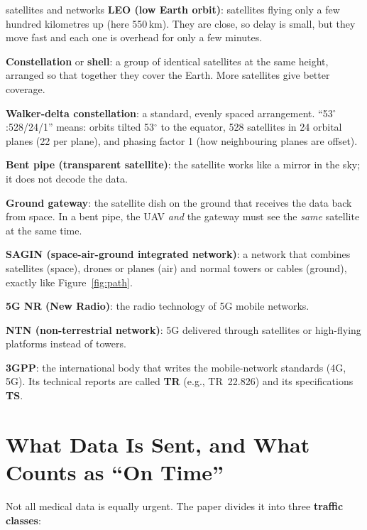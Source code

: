 \documentclass[11pt,a4paper]{article}
\newcommand{\kt}[1]{\textbf{\color{navy}#1}}
\begin{document}
\begin{term}{satellites and networks}
\kt{LEO (low Earth orbit)}: satellites flying only a few hundred kilometres up (here 550\,km). They are close, so delay is small, but they move fast and each one is overhead for only a few minutes.\par
\kt{Constellation} or \kt{shell}: a group of identical satellites at the same height, arranged so that together they cover the Earth. More satellites give better coverage.\par
\kt{Walker-delta constellation}: a standard, evenly spaced arrangement. ``53$^\circ$:528/24/1'' means: orbits tilted 53$^\circ$ to the equator, 528 satellites in 24 orbital planes (22 per plane), and phasing factor 1 (how neighbouring planes are offset).\par
\kt{Bent pipe (transparent satellite)}: the satellite works like a mirror in the sky; it does not decode the data.\par
\kt{Ground gateway}: the satellite dish on the ground that receives the data back from space. In a bent pipe, the UAV \emph{and} the gateway must see the \emph{same} satellite at the same time.\par
\kt{SAGIN (space-air-ground integrated network)}: a network that combines satellites (space), drones or planes (air) and normal towers or cables (ground), exactly like Figure~\ref{fig:path}.\par
\kt{5G NR (New Radio)}: the radio technology of 5G mobile networks.\par
\kt{NTN (non-terrestrial network)}: 5G delivered through satellites or high-flying platforms instead of towers.\par
\kt{3GPP}: the international body that writes the mobile-network standards (4G, 5G). Its technical reports are called \kt{TR} (e.g., TR~22.826) and its specifications \kt{TS}.
\end{term}

\section{What Data Is Sent, and What Counts as ``On Time''}

Not all medical data is equally urgent. The paper divides it into three \kt{traffic classes}:
\end{document}
